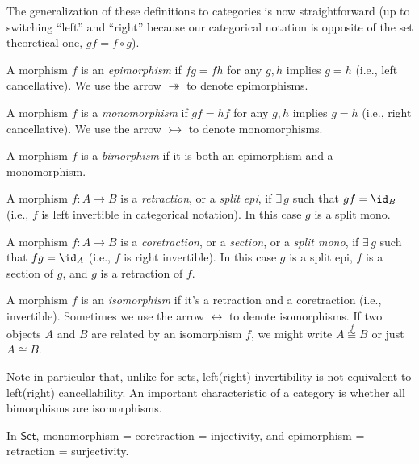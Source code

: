 The generalization of these definitions to categories is now straightforward
(up to switching ``left'' and ``right'' because our categorical
notation is opposite of the set theoretical one, $gf=f\circ g$).
\begin{defn}[Epimorphism]
    A morphism $f$ is an \emph{epimorphism} if $fg=fh$ for any $g,h$
    implies $g=h$ (i.e., left cancellative). We use the arrow $\twoheadrightarrow$ to denote epimorphisms.
\end{defn}
%
\begin{defn}[Monomorphism]
    A morphism $f$ is a \emph{monomorphism} if $gf=hf$ for any $g,h$
    implies $g=h$ (i.e., right cancellative). We use the arrow $\rightarrowtail$ to denote monomorphisms.
\end{defn}
%
\begin{defn}[Bimorphism]
    A morphism $f$ is a \emph{bimorphism} if it is both an epimorphism
    and a monomorphism.
\end{defn}
%
\begin{defn}
    A morphism $f:A\rightarrow B$ is a \emph{retraction}, or a\emph{
    split epi}, if $\exists\,g$ such that $gf=\id_{B}$ (i.e., $f$ is
    left invertible in categorical notation). In this case $g$ is a split
    mono.
\end{defn}
%
\begin{defn}
    A morphism $f:A\rightarrow B$ is a \emph{coretraction}, or a \emph{section},
    or a \emph{split mono}, if $\exists\,g$ such that $fg=\id_{A}$
    (i.e., $f$ is right invertible). In this case $g$ is a split epi, $f$ is a section of $g$, and $g$ is a retraction of $f$.
\end{defn}
%
\begin{defn}[Isomorphism]
    A morphism $f$ is an \emph{isomorphism} if it's a retraction and
    a coretraction (i.e., invertible). Sometimes we use the arrow $\leftrightarrow$ to denote isomorphisms. If two objects $A$ and $B$ are related by an isomorphism $f$, we might write $A\overset f\cong B$ or just $A\cong B$.
\end{defn}
Note in particular that, unlike for sets, left(right) invertibility
is not equivalent to left(right) cancellability. An important characteristic
of a category is whether all bimorphisms are isomorphisms.
\begin{prop}
    In $\mathsf{Set}$, monomorphism = coretraction = injectivity, and
    epimorphism = retraction = surjectivity.
\end{prop}
